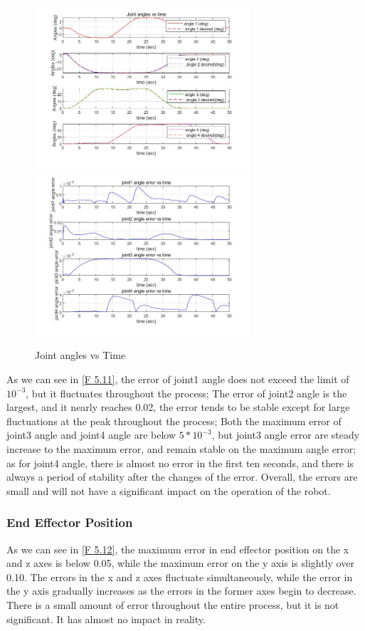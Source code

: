 \begin{figure}[htbp]
	\centering
	\includegraphics[width=8cm]{./fig/4.jpg}
	\includegraphics[width=8cm]{./fig/7.jpg}
	\caption{Joint angles vs Time}
	\label{F 5.11}
\end{figure}

As we can see in \autoref{F 5.11}, the error of joint1 angle does not exceed the limit of $10^{-3}$, but it fluctuates throughout the process;
The error of joint2 angle is the largest, and it nearly reaches 0.02, the error tends to be stable except for large fluctuations at the peak throughout the process;
Both the maximum error of joint3 angle and joint4 angle are below $5*10^{-3}$, but joint3 angle error are steady increase to the maximum error, and remain stable on the maximum angle error; as for joint4 angle, there is almost no error in the first ten seconds, and there is always a period of stability after the changes of the error.
Overall, the errors are small and will not have a significant impact on the operation of the robot.

\subsubsection*{End Effector Position}


As we can see in \autoref{F 5.12}, the maximum error in end effector position on the x and z axes is below 0.05, while the maximum error on the y axis is slightly over 0.10. The errors in the x and z axes fluctuate simultaneously, while the error in the y axis gradually increases as the errors in the former axes begin to decrease. There is a small amount of error throughout the entire process, but it is not significant. It has almost no impact in reality.

